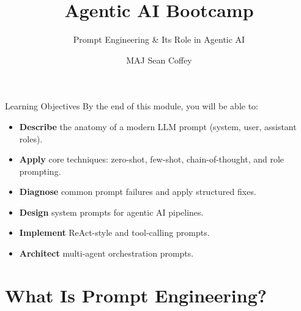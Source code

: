 \documentclass{beamer}
\title[]{Agentic AI Bootcamp}
\subtitle[]{Prompt Engineering \& Its Role in Agentic AI}
\author[]{MAJ Sean Coffey}
\institute{Army Cyber Institute, U.S. Military Academy}
\date{\monthyeardate}
\begin{document}
{\DivisionLogo
\begin{frame}
    \titlepage
\end{frame}
}

\begin{frame}{Learning Objectives}
    By the end of this module, you will be able to:
    \begin{itemize}
        \item \textbf{Describe} the anatomy of a modern LLM prompt (system, user, assistant roles).
        \item \textbf{Apply} core techniques: zero-shot, few-shot, chain-of-thought, and role prompting.
        \item \textbf{Diagnose} common prompt failures and apply structured fixes.
        \item \textbf{Design} system prompts for agentic AI pipelines.
        \item \textbf{Implement} ReAct-style and tool-calling prompts.
        \item \textbf{Architect} multi-agent orchestration prompts.
    \end{itemize}
\end{frame}

\section{What Is Prompt Engineering?}
\end{document}
